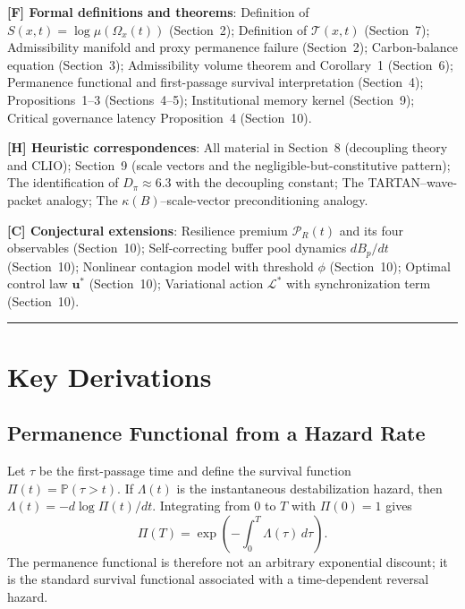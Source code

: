 \documentclass[12pt]{article}
\newcommand{\Tcal}{\mathcal{T}}
\begin{document}
\medskip
\noindent\textbf{[F] Formal definitions and theorems}:
Definition of $S(x,t)=\log\mu(\Omega_x(t))$ (Section~2);
Definition of $\Tcal(x,t)$ (Section~7);
Admissibility manifold and proxy permanence failure (Section~2);
Carbon-balance equation (Section~3);
Admissibility volume theorem and Corollary~1 (Section~6);
Permanence functional and first-passage survival interpretation (Section~4);
Propositions~1--3 (Sections~4--5);
Institutional memory kernel (Section~9);
Critical governance latency Proposition~4 (Section~10).

\medskip
\noindent\textbf{[H] Heuristic correspondences}:
All material in Section~8 (decoupling theory and CLIO);
Section~9 (scale vectors and the negligible-but-constitutive pattern);
The identification of $D_\pi\approx 6.3$ with the decoupling constant;
The TARTAN--wave-packet analogy;
The $\kappa(B)$--scale-vector preconditioning analogy.

\medskip
\noindent\textbf{[C] Conjectural extensions}:
Resilience premium $\mathcal{P}_R(t)$ and its four observables (Section~10);
Self-correcting buffer pool dynamics $dB_p/dt$ (Section~10);
Nonlinear contagion model with threshold $\phi$ (Section~10);
Optimal control law $\mathbf{u}^*$ (Section~10);
Variational action $\mathcal{L}^*$ with synchronization term (Section~10).

\bigskip
\noindent\rule{\linewidth}{0.4pt}
\bigskip

\section{Key Derivations}
\label{app:derivations}

\subsection{Permanence Functional from a Hazard Rate}

Let $\tau$ be the first-passage time and define the survival function $\Pi(t)=\mathbb{P}(\tau>t)$.
If $\Lambda(t)$ is the instantaneous destabilization hazard, then
$\Lambda(t) = -d\log\Pi(t)/dt$.
Integrating from $0$ to $T$ with $\Pi(0)=1$ gives
\begin{equation*}
\Pi(T)=\exp\!\left(-\int_0^T\Lambda(\tau)\,d\tau\right).
\end{equation*}
The permanence functional is therefore not an arbitrary exponential discount; it is the
standard survival functional associated with a time-dependent reversal hazard.
\end{document}
